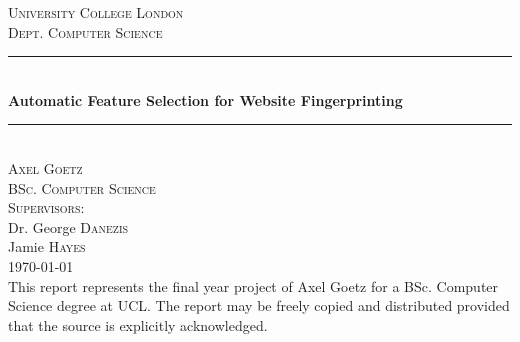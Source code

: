 \newcommand{\HRule}{\rule{\linewidth}{0.5mm}}
\thispagestyle{empty}

\begin{center}
  \textsc{\LARGE University College London}\\[0.5cm]
  \textsc{\Large Dept. Computer Science}\\[0.5cm]

  \HRule \\ [0.4cm]
  { \Large \bfseries Automatic Feature Selection for Website Fingerprinting}\\[0.3cm]
  \HRule \\ [1cm]

  \textsc{\LARGE Axel Goetz}\\[0.3cm]

  \textsc{\Large BSc. Computer Science}\\[1cm]
  \textsc{\large Supervisors:}\\[0.1cm]
  \normalsize Dr. George \textsc{Danezis}\\
  \normalsize Jamie \textsc{Hayes}\\
  \vspace{0.2cm}
  \today\\[13.5cm]
  \small This report represents the final year project of Axel Goetz for a BSc. Computer Science degree at UCL. The report may be freely copied and distributed provided that the source is explicitly acknowledged.

\end{center}

\newpage
